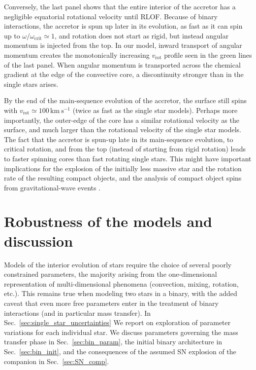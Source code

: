 \documentclass[twocolumn,twocolappendix,trackchanges]{aastex63}
\newcommand{\kms}{{\mathrm{km\ s^{-1}}}}
\DeclareRobustCommand{\Secref}[1]{Sec.~\ref{#1}}
\begin{document}
Conversely, the last panel shows that the entire interior of the
accretor has a negligible equatorial rotational velocity until
RLOF. Because of binary interactions, the accretor is spun up later in
its evolution, as fast as it can spin up to
$\omega/\omega_\mathrm{crit}\simeq1$, and rotation does not start as
rigid, but instead angular momentum is injected from the top. In our
model, inward transport of angular momentum creates the monotonically
increasing $v_\mathrm{rot}$ profile seen in the green lines of the
last panel. When angular momentum is transported across the chemical
gradient at the edge of the convective core, a discontinuity stronger
than in the single stars arises.

By the end of the main-sequence evolution of the accretor, the surface
still spins with $v_\mathrm{rot}\simeq100\,\kms$ (twice as fast as the
single star models). Perhaps more importantly, the outer-edge of the
core has a similar rotational velocity as the surface, and much larger
than the rotational velocity of the single star models. The fact that
the accretor is spun-up late in its main-sequence evolution, to
critical rotation, and from the top (instead of starting from rigid
rotation) leads to faster spinning cores than fast rotating single
stars. This might have important implications for the explosion of the
initially less massive star and the rotation rate of
the resulting compact objects, and the analysis of compact object
spins from gravitational-wave events \citep[e.g.,][]{zaldarriaga:18, qin:18, callister:21}.

\section{Robustness of the models and discussion}
\label{sec:discussion}

Models of the interior evolution of stars require the choice of
several poorly constrained parameters, the majority arising from the
one-dimensional representation of multi-dimensional phenomena
(convection, mixing, rotation, etc.). This remains true when modeling
two stars in a binary, with the added caveat that even more free
parameters enter in the treatment of binary interactions (and in
particular mass transfer). In \Secref{sec:single_star_uncertainties}
We report on exploration of parameter variations for each individual
star. We discuss parameters governing the mass transfer phase in
\Secref{sec:bin_param}, the initial binary architecture in
\Secref{sec:bin_init}, and the consequences of the assumed SN
explosion of the companion in \Secref{sec:SN_comp}.
\end{document}
